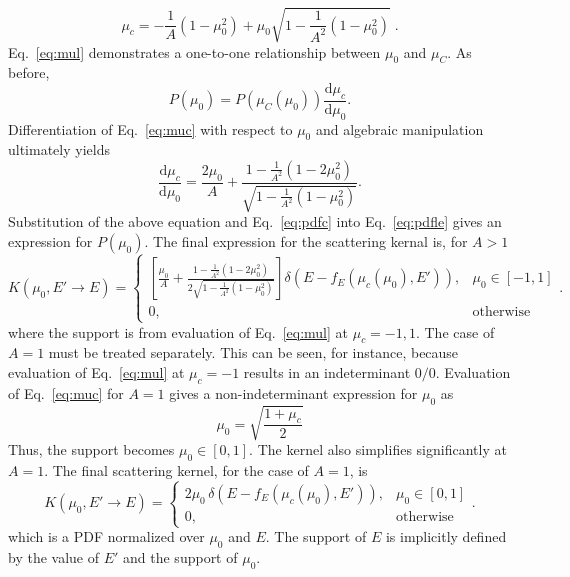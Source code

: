 \documentclass[12pt]{article}
\renewcommand{\d}{\mathrm{d}}
\newenvironment{solution}[1][Solution]{\begin{trivlist}
\item[\hskip \labelsep {\bfseries #1} {\hspace{-0.2em}\bfseries:}]\hspace{0.3in}\newline}{\end{trivlist}}
\begin{document}
\begin{solution}
\begin{equation}
    \mu_c = -\frac{1}{A}(1-\mu_0^2) + \mu_0\sqrt{1-\frac{1}{A^2}(1-\mu_0^2)}\;.
\end{equation}
Eq.~\eqref{eq:mul} demonstrates a one-to-one relationship between $\mu_0$ and
$\mu_C$.  As before,
\begin{equation}\label{eq:pdfle}
P(\mu_0) = P\left(\mu_C(\mu_0)\right)\frac{\d \mu_c}{\d \mu_0}.
\end{equation}
Differentiation of Eq.~\eqref{eq:muc} with respect to $\mu_0$ and algebraic
manipulation ultimately yields
\begin{equation}
    \frac{\d \mu_c}{\d \mu_0} = \frac{2 \mu_0}{A} + \frac{1 - \frac{1}{A^2}(1 -
2\mu_0^2)}{\sqrt{1 - \frac{1}{A^2}(1 - \mu_0^2)}}.
\end{equation}
Substitution of the above equation and Eq.~\eqref{eq:pdfc} into Eq.~\eqref{eq:pdfle}
gives an expression for $P(\mu_0)$. The final expression for the scattering kernal
is, for $A>1$
\begin{equation}
    \boxed{
K(\mu_0,E'\rightarrow E) = \left\{\begin{matrix} \displaystyle
\left[\frac{\mu_0}{A} + \frac{1 - \frac{1}{A^2}(1 -
2\mu_0^2)}{2\sqrt{1 - \frac{1}{A^2}(1 -
\mu_0^2)}}\right]{\delta(E-f_E\left(\mu_c(\mu_0),E'\right))}, & \mu_0\in[-1,1] \\ 
 0, & \text{otherwise}
\end{matrix}\right. 
}.
\end{equation}
where the support is from evaluation of Eq.~\eqref{eq:mul} at $\mu_c=-1,1$.  The case
of $A=1$ must be treated separately. This can be seen, for instance, because evaluation of
Eq.~\eqref{eq:mul} at $\mu_c=-1$ results in an indeterminant $0/0$. Evaluation of
Eq.~\eqref{eq:muc} for $A=1$ gives a non-indeterminant expression for $\mu_0$ as
\begin{equation}\label{eq:mu0}
    \mu_0 = \sqrt{\frac{1+\mu_c}{2}}
\end{equation}
Thus, the support becomes $\mu_0 \in [0,1]$.  The kernel also simplifies significantly at
$A=1$.  The final scattering kernel, for the case of $A=1$, is
\begin{equation}\label{answer}
\boxed{
K(\mu_0,E'\rightarrow E) = \left\{\begin{matrix}
2\mu_0\,\delta(E-f_E\left(\mu_c(\mu_0),E'\right)), & \mu_0\in[0,1] \\ 
 0, & \text{otherwise}
\end{matrix}\right. 
}.
\end{equation}
which is a PDF normalized over $\mu_0$ and $E$. The support of $E$ is implicitly
defined by the value of $E'$ and the support of $\mu_0$.


\end{solution}
\end{document}

